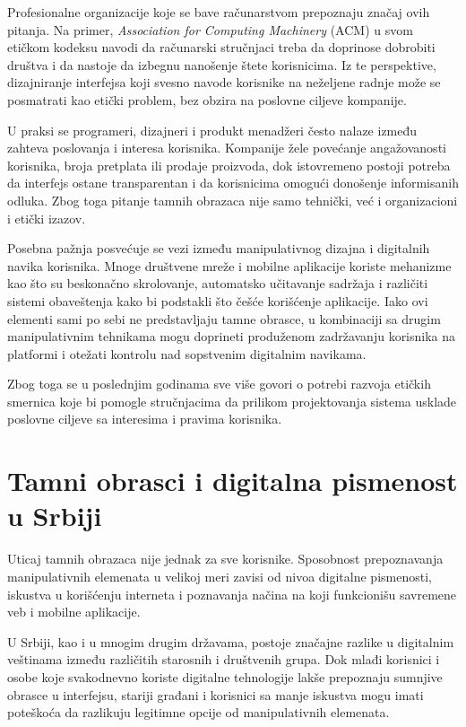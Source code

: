 \documentclass[12pt,a4paper]{article}
\begin{document}
Profesionalne organizacije koje se bave računarstvom prepoznaju značaj ovih pitanja. Na primer, \emph{Association for Computing Machinery} (ACM) u svom etičkom kodeksu navodi da računarski stručnjaci treba da doprinose dobrobiti društva i da nastoje da izbegnu nanošenje štete korisnicima. Iz te perspektive, dizajniranje interfejsa koji svesno navode korisnike na neželjene radnje može se posmatrati kao etički problem, bez obzira na poslovne ciljeve kompanije.

U praksi se programeri, dizajneri i produkt menadžeri često nalaze između zahteva poslovanja i interesa korisnika. Kompanije žele povećanje angažovanosti korisnika, broja pretplata ili prodaje proizvoda, dok istovremeno postoji potreba da interfejs ostane transparentan i da korisnicima omogući donošenje informisanih odluka. Zbog toga pitanje tamnih obrazaca nije samo tehnički, već i organizacioni i etički izazov.

Posebna pažnja posvećuje se vezi između manipulativnog dizajna i digitalnih navika korisnika. Mnoge društvene mreže i mobilne aplikacije koriste mehanizme kao što su beskonačno skrolovanje, automatsko učitavanje sadržaja i različiti sistemi obaveštenja kako bi podstakli što češće korišćenje aplikacije. Iako ovi elementi sami po sebi ne predstavljaju tamne obrasce, u kombinaciji sa drugim manipulativnim tehnikama mogu doprineti produženom zadržavanju korisnika na platformi i otežati kontrolu nad sopstvenim digitalnim navikama.

Zbog toga se u poslednjim godinama sve više govori o potrebi razvoja etičkih smernica koje bi pomogle stručnjacima da prilikom projektovanja sistema usklade poslovne ciljeve sa interesima i pravima korisnika.

\section{Tamni obrasci i digitalna pismenost u Srbiji}

Uticaj tamnih obrazaca nije jednak za sve korisnike. Sposobnost prepoznavanja manipulativnih elemenata u velikoj meri zavisi od nivoa digitalne pismenosti, iskustva u korišćenju interneta i poznavanja načina na koji funkcionišu savremene veb i mobilne aplikacije.

U Srbiji, kao i u mnogim drugim državama, postoje značajne razlike u digitalnim veštinama između različitih starosnih i društvenih grupa. Dok mlađi korisnici i osobe koje svakodnevno koriste digitalne tehnologije lakše prepoznaju sumnjive obrasce u interfejsu, stariji građani i korisnici sa manje iskustva mogu imati poteškoća da razlikuju legitimne opcije od manipulativnih elemenata.
\end{document}
